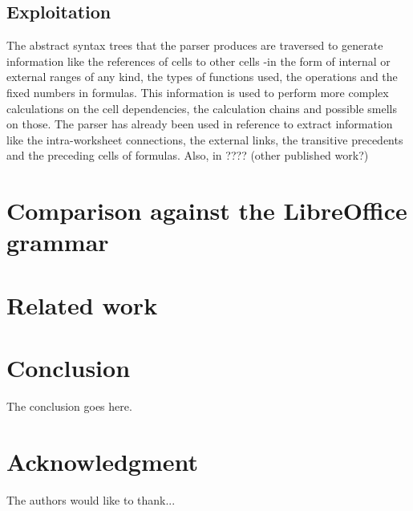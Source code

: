 \documentclass[conference]{IEEEtran}
\begin{document}
\subsection{Exploitation}
The abstract syntax trees that the parser produces are traversed to generate information like the references of cells to other cells -in the form of internal or external ranges of any kind, the types of functions used, the operations and the fixed numbers in formulas. This information is used to perform more complex calculations on the cell dependencies, the calculation chains and possible smells on those. The parser has already been used in reference \cite{EnronVSEuses} to extract information like the intra-worksheet connections, the external links, the transitive precedents and the preceding cells of formulas. Also, in ???? (other published work?)

\section{Comparison against the LibreOffice grammar}

\section{Related work}

\section{Conclusion}
The conclusion goes here.


\section*{Acknowledgment}
The authors would like to thank...




\end{document}
